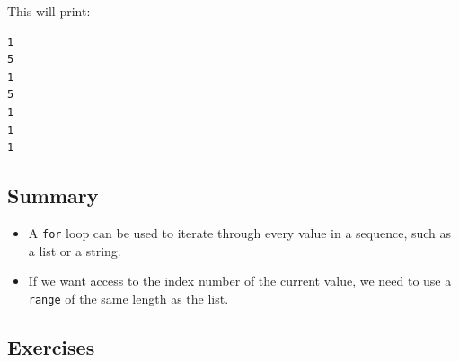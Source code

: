 \documentclass[11pt]{cselabheader}
\begin{document}
This will print:
\begin{lstlisting}[style=bash]
1
5
1
5
1
1
1
\end{lstlisting}

\subsection{Summary}
\begin{itemize}
  \item A \lstinline{for} loop can be used to iterate through every value in a
    sequence, such as a list or a string.
  \item If we want access to the index number of the current value, we need to
    use a \lstinline{range} of the same length as the list.
\end{itemize}

\subsection{Exercises}
\label{subsec:forex}
\end{document}
